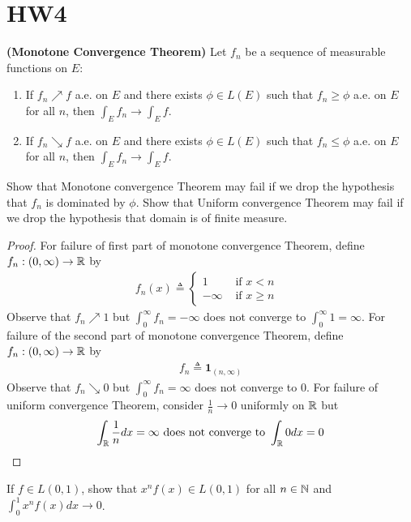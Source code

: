 \documentclass{report}
\begin{document}
\section{HW4}
\begin{theorem}
\textbf{(Monotone Convergence Theorem)} Let $f_n$ be a sequence of measurable functions on  $E$: 
 \begin{enumerate}[label=(\alph*)]
  \item If $f_n\nearrow f$ a.e. on  $E$ and there exists $\phi\in L(E)$  such that $f_n\geq \phi$ a.e. on $E$ for all  $n$, then  $\int_E f_n\to \int_E f$. 
  \item If $f_n\searrow f$ a.e. on  $E$ and there exists  $\phi \in L(E)$ such that $f_n \leq \phi$ a.e. on $E$ for all  $n$, then  $\int_E f_n \to \int_E f$. 
\end{enumerate}
\end{theorem}
\begin{question}{}{}
Show that Monotone convergence Theorem may fail if we drop the hypothesis that $f_n$ is dominated by  $\phi$. Show that Uniform convergence Theorem may fail if we drop the hypothesis that domain is of finite measure.  
\end{question}
\begin{proof}
For failure of first part of monotone convergence Theorem, define $f_n:(0,\infty)\rightarrow \mathbb{R}$ by 
\begin{align*}
f_n(x)\triangleq \begin{cases}
  1& \text{ if $x<n$ }\\
  -\infty & \text{ if $x\geq n$ }
\end{cases}
\end{align*}
Observe that $f_n\nearrow 1$ but $\int_0^{\infty} f_n=-\infty$ does not converge to $\int_0^{\infty} 1=\infty$. For failure of the second part of monotone convergence Theorem, define $f_n:(0,\infty)\rightarrow \mathbb{R}$ by 
\begin{align*}
f_n\triangleq \textbf{1}_{(n,\infty)}
\end{align*}
Observe that $f_n\searrow 0$ but $\int_0^{\infty} f_n=\infty$ does not converge to $0$. For failure of uniform convergence Theorem, consider $\frac{1}{n}\to 0$ uniformly on $\mathbb{R}$ but 
 \begin{align*}
\int_{\mathbb{R}} \frac{1}{n}dx=\infty \text{ does not converge to  }\int_{\mathbb{R}} 0dx=0
\end{align*}
\end{proof}
\begin{question}{}{}
If $f\in L(0,1)$, show that $x^nf(x)\in L(0,1)$ for all $n\in\mathbb{N}$ and $\int_0^1 x^n f(x)dx \to 0$. 
\end{question}
\end{document}
